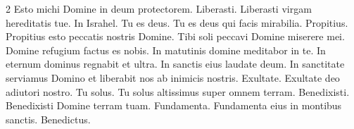 \begin{multicols*}{2}
 Esto michi Domine in deum protectorem.
 Liberasti.
 Liberasti virgam hereditatis tue.
 In Israhel.
 Tu es deus.
 Tu es deus qui facis mirabilia.
 Propitius.
 Propitius esto peccatis nostris Domine.
 Tibi soli peccavi Domine miserere mei.
 Domine refugium factus es nobis.
 In matutinis domine meditabor in te.
 In eternum dominus regnabit et ultra.
 In sanctis eius laudate deum.
 In sanctitate serviamus Domino et liberabit nos ab inimicis nostris.
 Exultate.
 Exultate deo adiutori nostro.
 Tu solus.
 Tu solus altissimus super omnem terram.
 Benedixisti.
 Benedixisti Domine terram tuam.
 Fundamenta.
 Fundamenta eius in montibus sanctis.
 Benedictus.

\end{multicols*}
